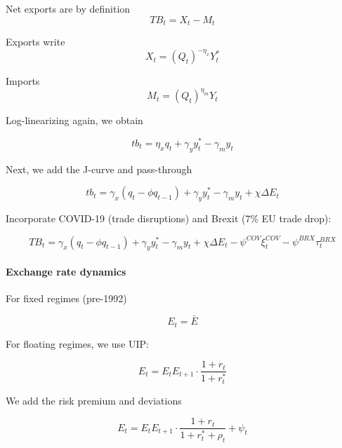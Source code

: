\documentclass[
]{article}
\begin{document}
Net exports are by definition
\begin{equation*}
TB_t = X_t - M_t
\end{equation*}

Exports write
\begin{equation*}
X_t = (Q_t)^{-\eta_x} Y_t^*
\end{equation*}

Imports
\begin{equation*}
M_t = (Q_t)^{\eta_m} Y_t
\end{equation*}

Log-linearizing again, we obtain

\begin{equation*}
tb_t = \eta_x q_t + \gamma_y y_t^* - \gamma_m y_t
\end{equation*}

Next, we add the J-curve %
and pass-through%

\begin{equation*}
tb_t = \gamma_x (q_t - \phi q_{t-1}) + \gamma_y y_t^* - \gamma_m y_t + \chi \Delta E_t
\end{equation*}

Incorporate COVID-19 (trade disruptions) and Brexit (7\% EU trade drop):

\begin{equation}
TB_t = \gamma_x (q_t - \phi q_{t-1}) + \gamma_y y_t^* - \gamma_m y_t + \chi \Delta E_t - \psi^{COV} \xi_t^{COV} - \psi^{BRX} \tau_t^{BRX}
\label{eq:tb}
\end{equation}

\paragraph*{Exchange rate dynamics}

For fixed regimes (pre-1992)

\begin{equation*}
E_t = \bar{E}
\end{equation*}

For floating regimes, we use UIP:

\begin{equation*}
E_t = E_t E_{t+1} \cdot \frac{1 + r_t}{1 + r_t^*}
\end{equation*}

We add the risk premium and deviations %

\begin{equation*}
E_t = E_t E_{t+1} \cdot \frac{1 + r_t}{1 + r_t^* + \rho_t} + \psi_t
\end{equation*}
\end{document}
